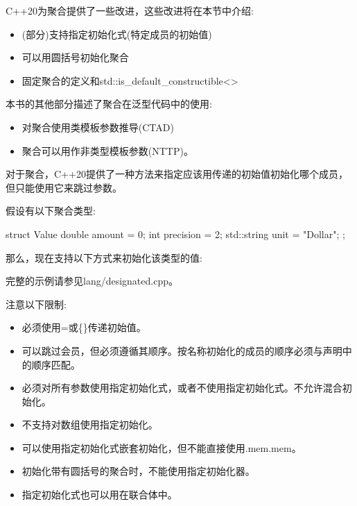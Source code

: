
C++20为聚合提供了一些改进，这些改进将在本节中介绍:

\begin{itemize}
\item
(部分)支持指定初始化式(特定成员的初始值)

\item
可以用圆括号初始化聚合

\item
固定聚合的定义和std::is\_default\_constructible<>
\end{itemize}

本书的其他部分描述了聚合在泛型代码中的使用:

\begin{itemize}
\item
对聚合使用类模板参数推导(CTAD)

\item
聚合可以用作非类型模板参数(NTTP)。
\end{itemize}


对于聚合，C++20提供了一种方法来指定应该用传递的初始值初始化哪个成员，但只能使用它来跳过参数。

假设有以下聚合类型:

\begin{cpp}
struct Value {
	double amount = 0;
	int precision = 2;
	std::string unit = "Dollar";
};
\end{cpp}

那么，现在支持以下方式来初始化该类型的值:


完整的示例请参见lang/designated.cpp。

注意以下限制:

\begin{itemize}
\item
必须使用=或\{\}传递初始值。

\item
可以跳过会员，但必须遵循其顺序。按名称初始化的成员的顺序必须与声明中的顺序匹配。

\item
必须对所有参数使用指定初始化式，或者不使用指定初始化式。不允许混合初始化。

\item
不支持对数组使用指定初始化。

\item
可以使用指定初始化式嵌套初始化，但不能直接使用.mem.mem。

\item
初始化带有圆括号的聚合时，不能使用指定初始化器。

\item
指定初始化式也可以用在联合体中。
\end{itemize}

